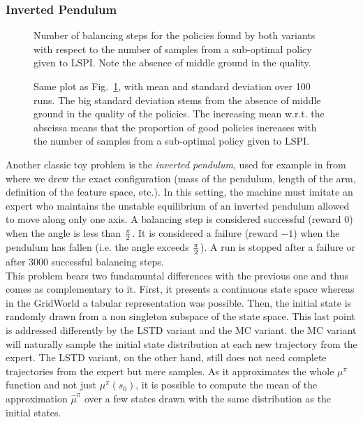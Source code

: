 \documentclass{llncs}
\begin{document}
\subsubsection{Inverted Pendulum}
\begin{figure}
\centering
\resizebox{\columnwidth}{!}{}
\caption{Number of balancing steps for the policies found by both variants with respect to the number of samples from a sub-optimal policy given to LSPI. Note the absence of middle ground in the quality.}
\label{fig:threshold}
\end{figure}
\begin{figure}
\centering
\resizebox{\columnwidth}{!}{}
\caption{Same plot as Fig.~\ref{fig:threshold}, with mean and standard deviation over 100 runs. The big standard deviation stems from the absence of middle ground in the quality of the policies. The increasing mean w.r.t. the abscissa means that the proportion of good policies increases with the number of samples from a sub-optimal policy given to LSPI.}
\label{fig:threshold_EB}
\end{figure}
Another classic toy problem is the \emph{inverted pendulum}, used for example in \citep{lagoudakis2003least} from where we drew the exact configuration (mass of the pendulum, length of the arm, definition of the feature space, etc.). In this setting, the machine must imitate an expert who maintains the unstable equilibrium of an inverted pendulum allowed to move along only one axis. A balancing step is considered successful (reward $0$) when the angle is less than $\pi\over 2$. It is considered a failure (reward $-1$) when the pendulum has fallen (i.e. the angle exceeds $\pi \over 2$). A run is stopped after a failure or after 3000 successful balancing steps.\\

This problem bears two fundamuntal differences with the previous one and thus comes as complementary to it. First, it presents a continuous state space whereas in the GridWorld a tabular representation was possible. Then, the initial state is randomly drawn from a non singleton subspace of the state space. This last point is addressed differently by the LSTD variant and the MC variant. the MC variant will naturally sample the initial state distribution at each new trajectory from the expert. The LSTD variant, on the other hand, still does not need complete trajectories from the expert but mere samples. As it approximates the whole $\mu^{\pi}$ function and not just $\mu^\pi(s_0)$, it is possible to compute the mean of the approximation $\hat\mu^\pi$ over a few states drawn with the same distribution as the initial states.\\
\end{document}
